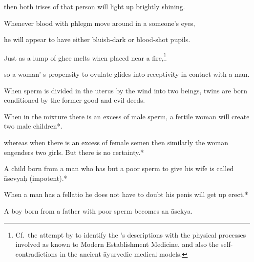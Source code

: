 \begin{translation}
\begin{tt}
\item[36f]

then both irises of that person will light up brightly shining. 
  
\item[36g]

Whenever blood with phlegm move around in a someone’s eyes,
  
\item[36h]

he will appear to have either bluish-dark or blood-shot pupils. 
  
\item[36i]

Just as a lump of ghee melts when placed near a fire,\footnote{Cf.\ the attempt 
by \citet[222--241]{das-2003} to identify the \SS's descriptions with the physical 
processes involved as known to Modern Establishment Medicine, and also the 
self-contradictions in the ancient āyurvedic medical models.}
  
\item[36j]

so a woman’ s propensity to ovulate glides into receptivity in contact 
  with a man.  
  
\item[37]

When sperm is divided in the uterus by the wind into two beings, twins 
  are born conditioned by the former good and evil deeds.  
  
\item[37.1]

When in the mixture there is an excess of male sperm, a fertile woman 
  will create two male children*.
  
\item[37.2]

whereas when there is an excess of female semen then similarly the 
  woman engenders two girls. But there is no certainty.*
  
\item[37.3]

 A child born from a man who has but a poor sperm to give his wife is 
  called āsevyaḥ (impotent).*
  
\item[38cd]

When a man has a fellatio he does not have to doubt his penis will get 
  up erect.*
  
\item[38]

 A boy born from a father with poor sperm becomes an āsekya.
  

\end{tt}
\end{translation}
